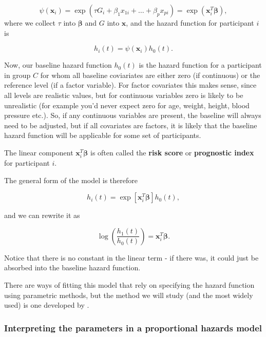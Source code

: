 \documentclass[
  openany]{book}
\theoremstyle{definition}
\theoremstyle{definition}
\theoremstyle{definition}
\theoremstyle{definition}
\theoremstyle{remark}
\begin{document}
\[\psi\left(\mathbf{x}_i\right) = \exp\left(\tau G_i + \beta_1x_{1i} + \ldots + \beta_p x_{pi}\right) = \exp\left(\mathbf{x}_i^T \boldsymbol\beta\right),\]
where we collect \(\tau\) into \(\boldsymbol\beta\) and \(G\) into \(\mathbf{x}\), and the hazard function for participant \(i\) is

\[h_i\left(t\right) = \psi\left(\mathbf{x}_i\right)h_0\left(t\right). \]

Now, our baseline hazard function \(h_0\left(t\right)\) is the hazard function for a participant in group \(C\) for whom all baseline coviariates are either zero (if continuous) or the reference level (if a factor variable). For factor covariates this makes sense, since all levels are realistic values, but for continuous variables zero is likely to be unrealistic (for example you'd never expect zero for age, weight, height, blood pressure etc.). So, if any continuous variables are present, the baseline will always need to be adjusted, but if all covariates are factors, it is likely that the baseline hazard function will be applicable for some set of participants.

The linear component \(\mathbf{x}_i^T\boldsymbol\beta\) is often called the \textbf{risk score} or \textbf{prognostic index} for participant \(i\).

The general form of the model is therefore

\begin{equation}
h_i\left(t\right) = \exp\left[\mathbf{x}_i^T\boldsymbol\beta\right]h_0\left(t\right),
\label{eq:hazfun}
\end{equation}

and we can rewrite it as

\[\log\left(\frac{h_1\left(t\right)}{h_0\left(t\right)}\right) = \mathbf{x}_i^T\boldsymbol\beta.\]

Notice that there is no constant in the linear term - if there was, it could just be absorbed into the baseline hazard function.

There are ways of fitting this model that rely on specifying the hazard function using parametric methods, but the method we will study (and the most widely used) is one developed by \citet{cox1972regression}.

\subsubsection{Interpreting the parameters in a proportional hazards model}\label{interpreting-the-parameters-in-a-proportional-hazards-model}
\end{document}
